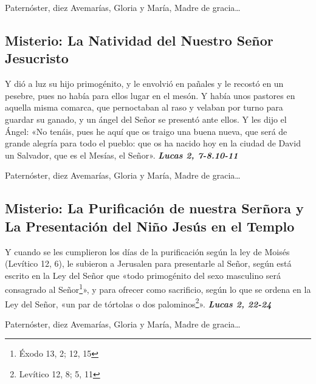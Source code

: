 \documentclass[./rosary.tex]{subfiles}
\newcounter{joyful-counter}
\begin{document}
\begin{center}
      Paternóster, diez Avemarías, Gloria y María, Madre de gracia{\ldots}
\end{center}

\bigskip

\subsection*{ Misterio: La Natividad del Nuestro Señor Jesucristo}

Y dió a luz su hijo primogénito, y le envolvió en pañales y le recostó en un pesebre, pues no había para ellos lugar en el mesón.
Y había unos pastores en aquella misma comarca, que pernoctaban al raso y velaban por turno para guardar su ganado,
y un ángel del  Señor se presentó ante ellos. Y les dijo el Ángel: «No tenáis, pues he aquí que os traigo una buena nueva,
que será de grande alegría para todo el pueblo: que os ha nacido hoy en la ciudad de David un Salvador, que es el Mesías, el Señor». 
\textbf{\emph{Lucas 2, 7-8.10-11}}

\begin{center}
      Paternóster, diez Avemarías, Gloria y María, Madre de gracia{\ldots}
\end{center}

\bigskip

\subsection*{ Misterio: La Purificación de nuestra Serñora y La Presentación del Niño Jesús en el Templo}

Y cuando se les cumplieron los días de la purificación según la ley de Moisés (Levítico 12, 6),
le subieron a Jerusalen para presentarle al Señor, según está escrito en la Ley del Señor que «todo primogénito
del sexo masculino será consagrado al Señor\footnote{Éxodo 13, 2; 12, 15\label{primogenito}}», y para ofrecer como sacrificio,
según lo que se ordena en la Ley del Señor, «un par de tórtolas o dos palominos\footnote{Levítico 12, 8; 5, 11\label{sacrificio}}». 
\textbf{\emph{Lucas 2, 22-24}}

\begin{center}
      Paternóster, diez Avemarías, Gloria y María, Madre de gracia{\ldots}
\end{center}

\bigskip
\end{document}
